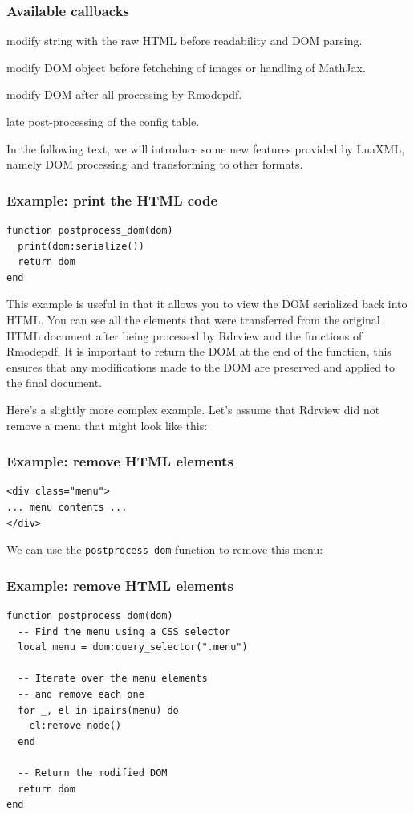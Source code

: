 \begin{frame}[fragile]
  \frametitle{Available callbacks}
  \begin{description}
  \item[\texttt{preprocess\_content}] modify string with the raw HTML before
    readability and DOM parsing.
  \item[\texttt{preprocess\_dom}] modify DOM object before fetchching of images
    or handling of MathJax.
  \item[\texttt{postprocess\_dom}] modify DOM after all processing by Rmodepdf.
  \item[\texttt{postprocess}] late post-processing of the config table.
\end{description}

\end{frame}

In the following text, we will introduce some new features provided by LuaXML, 
namely DOM processing and transforming to other formats.

\begin{frame}[fragile]
  \frametitle{Example: print the HTML code}


\begin{verbatim}
function postprocess_dom(dom)
  print(dom:serialize())
  return dom
end
\end{verbatim}
\end{frame}

This example is useful in that it allows you to view the DOM serialized back
into HTML. You can see all the elements that were transferred from the original
HTML document after being processed by Rdrview and the functions of Rmodepdf.
It is important to return the DOM at the end of the function, this ensures that
any modifications made to the DOM are preserved and applied to the final
document.

Here's a slightly more complex example. Let's assume that Rdrview did
not remove a menu that might look like this:

\begin{frame}[fragile]
  \frametitle{Example: remove HTML elements}
\begin{verbatim}
<div class="menu">
... menu contents ...
</div>
\end{verbatim}
\end{frame}


We can use the \texttt{postprocess\_dom} function to remove this menu:

\begin{frame}[fragile]
  \frametitle{Example: remove HTML elements}
\begin{verbatim}
function postprocess_dom(dom)
  -- Find the menu using a CSS selector
  local menu = dom:query_selector(".menu")

  -- Iterate over the menu elements 
  -- and remove each one
  for _, el in ipairs(menu) do
    el:remove_node()
  end
  
  -- Return the modified DOM
  return dom
end
\end{verbatim}
\end{frame}

